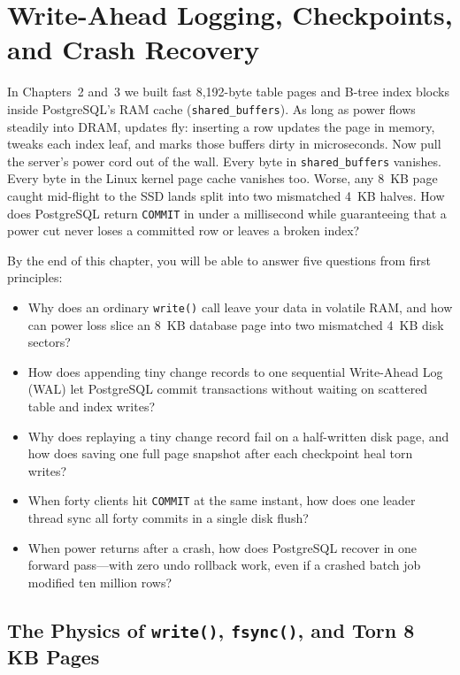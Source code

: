 \chapter{Write-Ahead Logging, Checkpoints, and Crash Recovery}
\label{ch:wal-recovery}

In Chapters~2 and~3 we built fast 8,192-byte table pages and B-tree index blocks inside PostgreSQL's RAM cache (\texttt{shared\_buffers}). As long as power flows steadily into DRAM, updates fly: inserting a row updates the page in memory, tweaks each index leaf, and marks those buffers dirty in microseconds. Now pull the server's power cord out of the wall. Every byte in \texttt{shared\_buffers} vanishes. Every byte in the Linux kernel page cache vanishes too. Worse, any 8~KB page caught mid-flight to the SSD lands split into two mismatched 4~KB halves. How does PostgreSQL return \texttt{COMMIT} in under a millisecond while guaranteeing that a power cut never loses a committed row or leaves a broken index?

\begin{focusbox}
By the end of this chapter, you will be able to answer five questions from first principles:
\begin{itemize}
  \item Why does an ordinary \texttt{write()} call leave your data in volatile RAM, and how can power loss slice an 8~KB database page into two mismatched 4~KB disk sectors?
  \item How does appending tiny change records to one sequential Write-Ahead Log (WAL) let PostgreSQL commit transactions without waiting on scattered table and index writes?
  \item Why does replaying a tiny change record fail on a half-written disk page, and how does saving one full page snapshot after each checkpoint heal torn writes?
  \item When forty clients hit \texttt{COMMIT} at the same instant, how does one leader thread sync all forty commits in a single disk flush?
  \item When power returns after a crash, how does PostgreSQL recover in one forward pass---with zero undo rollback work, even if a crashed batch job modified ten million rows?
\end{itemize}
\end{focusbox}

\chapterline

\section{The Physics of \texttt{write()}, \texttt{fsync()}, and Torn 8 KB Pages}
\label{ch04:physics}

